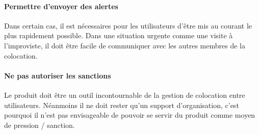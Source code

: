 \paragraph{Permettre d'envoyer des alertes \\}
Dans certain cas, il est nécessaires pour les utilisateurs d'être mis au courant le plus rapidement possible. Dans une situation urgente comme une visite à l'improviste, il doit être facile de communiquer avec les autres membres de la colocation.

\paragraph{Ne pas autoriser les sanctions \\}
Le produit doit être un outil incontournable de la gestion de colocation entre utilisateurs. Néanmoins il ne doit rester qu'un support d'organisation, c'est pourquoi il n'est pas envisageable de pouvoir se servir du produit comme moyen de pression / sanction. 